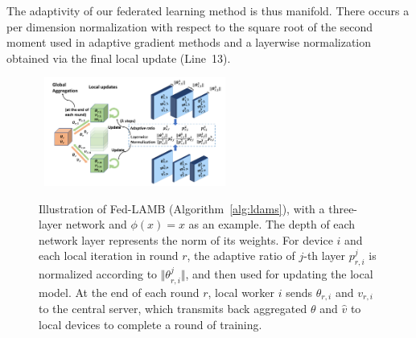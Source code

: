 \documentclass{article}
\begin{document}
The adaptivity of our federated learning method is thus manifold. 
There occurs a per dimension normalization with respect to the square root of the second moment used in adaptive gradient methods and a layerwise normalization obtained via the final local update (Line~13).


\begin{figure}[H]
\mbox{\hspace{-0.15in}
        \includegraphics[width=0.53\textwidth]{plot/plot1.pdf}
}
    \vspace{-0.2in}
	\caption{Illustration of Fed-LAMB (Algorithm~\ref{alg:ldams}), with a three-layer network and $\phi(x)=x$ as an example. The depth of each network layer represents the norm of its weights. For device $i$ and each local iteration in round $r$, the adaptive ratio of $j$-th layer $p_{r,i}^j$ is normalized according to $\Vert \theta_{r,i}^j\Vert$, and then used for updating the local model. At the end of each round $r$, local worker $i$ sends $\theta_{r,i}$ and $v_{r,i}$ to the central server, which transmits back aggregated $\theta$ and $\hat v$ to local devices to complete a round of training.}
	\label{fig:illustrate}\vspace{-0.1in}
\end{figure}
\end{document}
